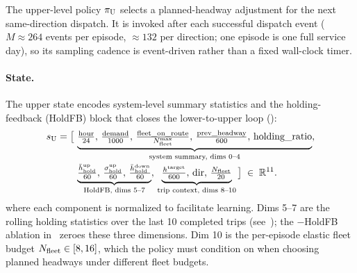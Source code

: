 The upper-level policy $\pi_{\mathrm{U}}$ selects a planned-headway adjustment for the next same-direction dispatch.
It is invoked after each successful dispatch event ($M \approx 264$ events per episode, $\approx 132$ per direction; one episode is one full service day), so its sampling cadence is event-driven rather than a fixed wall-clock timer.

\paragraph{State.}
The upper state encodes system-level summary statistics and the holding-feedback (HoldFB) block that closes the lower-to-upper loop ():
{\small
\begin{equation}
  \label{eq:upper_state}
  \begin{aligned}
    s_{\mathrm{U}} = \bigl[\,
      &\underbrace{\tfrac{\text{hour}}{24},\,
                   \tfrac{\text{demand}}{1000},\,
                   \tfrac{\text{fleet\_on\_route}}{N_{\mathrm{fleet}}^{\max}},\,
                   \tfrac{\text{prev\_headway}}{600},\,
                   \text{holding\_ratio}}_{\text{system summary, dims 0--4}},\\[-1pt]
      &\underbrace{\tfrac{\bar{h}^{\mathrm{up}}_{\mathrm{hold}}}{60},\,
                   \tfrac{\sigma^{\mathrm{up}}_{\mathrm{hold}}}{60},\,
                   \tfrac{\bar{h}^{\mathrm{down}}_{\mathrm{hold}}}{60}}_{\text{HoldFB, dims 5--7}},\,
       \underbrace{\tfrac{h^{\mathrm{target}}}{600},\,\mathrm{dir},\,\tfrac{N_{\mathrm{fleet}}}{20}}_{\text{trip context, dims 8--10}}
    \,\bigr] \;\in\; \mathbb{R}^{11}.
  \end{aligned}
\end{equation}
}
where each component is normalized to facilitate learning. Dims 5--7 are the rolling holding statistics over the last 10 completed trips (see~); the $-$HoldFB ablation in~ zeroes these three dimensions. Dim 10 is the per-episode elastic fleet budget $N_{\mathrm{fleet}} \in [8, 16]$, which the policy must condition on when choosing planned headways under different fleet budgets.

